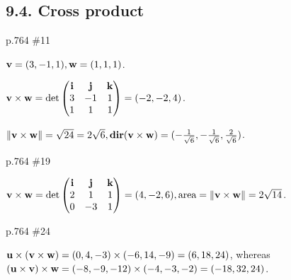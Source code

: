 \subsection*{9.4. Cross product}
\begin{practice}p.764 \#11\end{practice}
\begin{pracsol}
  $\mathbf v=(3,-1,1),\mathbf w=(1,1,1)$.

  $\mathbf v\times\mathbf w=\det\begin{pmatrix}
    \mathbf i&\mathbf j&\mathbf k\\
    3 & -1 & 1\\
    1 & 1 & 1
  \end{pmatrix}=(-2,-2,4)$.

  $\|\mathbf v\times\mathbf w\|=\sqrt{24}=2\sqrt6, \operatorname{\mathbf{dir}}(\mathbf v\times\mathbf w)=(-\frac1{\sqrt6},-\frac1{\sqrt6},\frac2{\sqrt6})$.
\end{pracsol}
\begin{practice}p.764 \#19\end{practice}
\begin{pracsol}
  $\mathbf v\times\mathbf w=\det\begin{pmatrix}
    \mathbf i & \mathbf j & \mathbf k\\
    2 & 1 & 1\\
    0 & -3 & 1
  \end{pmatrix}=(4,-2,6), \text{area}=\|\mathbf v\times\mathbf w\|=2\sqrt{14}$.
\end{pracsol}
\begin{practice}p.764 \#24\end{practice}
\begin{pracsol}
  $\mathbf u\times(\mathbf v\times\mathbf w)=(0,4,-3)\times(-6,14,-9)=(6,18,24)$, whereas $(\mathbf u\times\mathbf v)\times\mathbf w=(-8,-9,-12)\times(-4,-3,-2)=(-18,32,24)$.
\end{pracsol}
